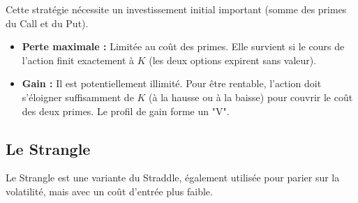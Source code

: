 \begin{intuitionbox}
Cette stratégie nécessite un investissement initial important (somme des primes du Call et du Put).
\begin{itemize}
    \item \textbf{Perte maximale :} Limitée au coût des primes. Elle survient si le cours de l'action finit exactement à $K$ (les deux options expirent sans valeur).
    \item \textbf{Gain :} Il est potentiellement illimité. Pour être rentable, l'action doit s'éloigner suffisamment de $K$ (à la hausse ou à la baisse) pour couvrir le coût des deux primes. Le profil de gain forme un "V".
\end{itemize}
\end{intuitionbox}

\begin{center}
\end{center}

\subsection{Le Strangle}

Le Strangle est une variante du Straddle, également utilisée pour parier sur la volatilité, mais avec un coût d'entrée plus faible.

